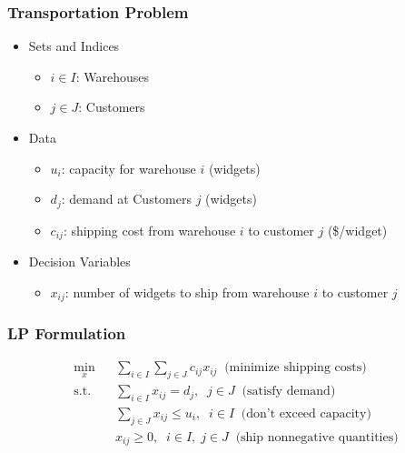 \documentclass[12pt,handout]{beamer}
\begin{document}
\begin{frame}
\frametitle{Transportation Problem}
\begin{itemize}
\item Sets and Indices
    \begin{itemize}
    \item $i \in I$: Warehouses
    \item $j \in J$: Customers
    \end{itemize}
\item Data
    \begin{itemize}
    \item $u_i$: capacity for warehouse $i$ (widgets)
    \item $d_j$: demand at Customers $j$ (widgets)
    \item $c_{ij}$: shipping cost from warehouse $i$ to customer $j$ (\$/widget)
    \end{itemize}
\item Decision Variables
    \begin{itemize}
    \item $x_{ij}$: number of widgets to ship from warehouse $i$ to customer $j$
    \end{itemize}
\end{itemize}
\end{frame}

\begin{frame}
\frametitle{LP Formulation}
\begin{eqnarray}
\min_{x} && \sum_{i \in I} \sum_{j \in J} c_{ij} x_{ij} \;\; \mbox{(minimize shipping costs)} \nonumber \\
\mbox{s.t.} && \sum_{i \in I} x_{ij} = d_j,\;\;j \in J \;\; \mbox{(satisfy demand)}\nonumber \\
&& \sum_{j \in J} x_{ij} \le u_i,\;\;i \in I \;\; \mbox{(don't exceed capacity)} \nonumber \\
&& x_{ij} \ge 0, \;\;i \in I,\;j \in J \;\; \mbox{(ship nonnegative quantities)} \nonumber
\end{eqnarray}
\end{frame}
\end{document}
